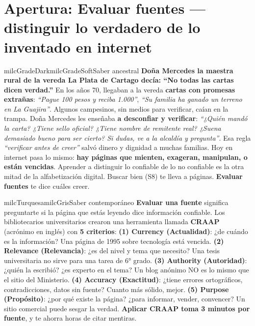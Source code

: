 \documentclass[11pt,letterpaper]{article}
\begin{document}
\section*{Apertura: Evaluar fuentes --- distinguir lo verdadero de lo inventado en internet}

\begin{softbox}{milcGradeDark}{milcGradeSoft}{Saber ancestral}
\textbf{Doña Mercedes la maestra rural de la vereda La Plata de Cartago decía: ``No todas las cartas dicen verdad.''} En los años 70, llegaban a la vereda \textbf{cartas con promesas extrañas}: \emph{``Pague 100 pesos y reciba 1.000''}, \emph{``Su familia ha ganado un terreno en La Guajira''}. Algunos campesinos, sin medios para verificar, caían en la trampa. Doña Mercedes les enseñaba \textbf{a desconfiar y verificar}: \emph{``¿Quién mandó la carta? ¿Tiene sello oficial? ¿Tiene nombre de remitente real? ¿Suena demasiado bueno para ser cierto? Si dudas, ve a la alcaldía y pregunta''}. Esa regla \emph{``verificar antes de creer''} salvó dinero y dignidad a muchas familias. Hoy en internet pasa lo mismo: \textbf{hay páginas que mienten, exageran, manipulan, o están vencidas}. Aprender a distinguir lo confiable de lo no confiable es la otra mitad de la alfabetización digital. Buscar bien (S8) te lleva a páginas. \textbf{Evaluar fuentes} te dice cuáles creer.
\end{softbox}

\begin{softbox}{milcTurquesa}{milcGris}{Saber contemporáneo}
\textbf{Evaluar una fuente} significa preguntarte si la página que estás leyendo dice información confiable. Los bibliotecarios universitarios crearon una herramienta llamada \textbf{CRAAP} (acrónimo en inglés) con \textbf{5 criterios}: \textbf{(1) Currency (Actualidad)}: ¿de cuándo es la información? Una página de 1995 sobre tecnología está vencida. \textbf{(2) Relevance (Relevancia)}: ¿es del nivel y tema que necesito? Una tesis universitaria no sirve para una tarea de 6° grado. \textbf{(3) Authority (Autoridad)}: ¿quién la escribió? ¿es experto en el tema? Un blog anónimo NO es lo mismo que el sitio del Ministerio. \textbf{(4) Accuracy (Exactitud)}: ¿tiene errores ortográficos, contradicciones, datos sin fuente? Cuanto más sólido, mejor. \textbf{(5) Purpose (Propósito)}: ¿por qué existe la página? ¿para informar, vender, convencer? Un sitio comercial puede sesgar la verdad. \textbf{Aplicar CRAAP toma 3 minutos por fuente}, y te ahorra horas de citar mentiras.
\end{softbox}
\end{document}
